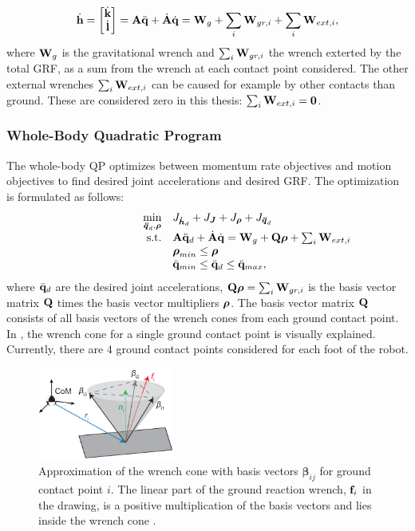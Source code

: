 \begin{equation}
\dot{\mathbf{h}}=\begin{bmatrix}\dot{\mathbf{k}}\\ \dot{\mathbf{l}} \end{bmatrix} =\mathbf{A}\ddot{\mathbf{q}} +\dot{\mathbf{A}}\dot{\mathbf{q}} = \mathbf{W}_g + \sum_i\mathbf{W}_{gr,i} + \sum_i \mathbf{W}_{ext,i}, 
\end{equation}
where $\mathbf{W}_g$ is the gravitational wrench and $\sum_i\mathbf{W}_{gr,i}$ the wrench exterted by the total \ac{GRF}, as a sum from the wrench at each contact point considered. The other external wrenches $\sum_i \mathbf{W}_{ext,i}$ can be caused for example by other contacts than ground. These are considered zero in this thesis: $\sum_i \mathbf{W}_{ext,i}=\mathbf{0}$.
\subsubsection{Whole-Body Quadratic Program} 
The whole-body \ac{QP} \cite{koolen2016design} optimizes between momentum rate objectives and motion objectives to find desired joint accelerations and desired \ac{GRF}. The optimization is formulated as follows:
\begin{equation}
\begin{array}{rlcl}
\displaystyle \min_{\bs{\ddot{q}}_d,\bs{\rho}} & \multicolumn{3}{l}{J_{\bs{\dot{h}}_d} + J_{\bs{J}} + J_{\bs{\rho}} + J_{\bs{\ddot{q}}_d} } \\%
\textrm{s.t.} & \matr{A}\ddqjntd + \dot{\matr{A}}\dqjnt = \matr{W}_g + \matr{Q}\bs{\rho}+\sum_i\matr{W}_{ext,i}\\
&\displaystyle \bs{\rho}_{min} \leq \bs{\rho}\\
&\ddot{\qjnt}_{min} \leq \ddqjntd \leq \ddot{\qjnt}_{max},
\end{array}
\end{equation}
where $\ddot{\mathbf{q}}_d$ are the desired joint accelerations, $\mathbf{Q}\boldsymbol{\rho} = \sum_i\mathbf{W}_{gr,i}$ is the basis vector matrix $\mathbf{Q}$ times the basis vector multipliers $\boldsymbol{\rho}$. The basis vector matrix $\mathbf{Q}$ consists of all basis vectors of the wrench cones from each ground contact point. In , the wrench cone for a single ground contact point is visually explained. Currently, there are $4$ ground contact points considered for each foot of the robot.
\begin{figure}
\centering
\includegraphics[width=0.4\textwidth]{STYLESTUFF/wrenchcone.png}
\caption{Approximation of the wrench cone with basis vectors $\boldsymbol{\beta}_{ij}$ for ground contact point $i$. The linear part of the ground reaction wrench, $\mathbf{f}_i$ in the drawing, is a positive multiplication of the basis vectors and lies inside the wrench cone \cite{koolen2016design}. }
\label{fig:wrenchcone}
\end{figure}
